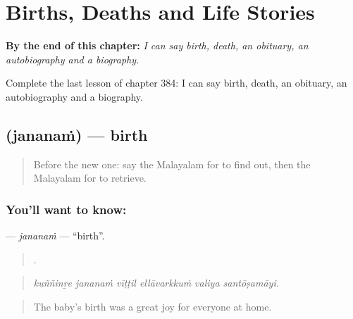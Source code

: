 
\chapter{Births, Deaths and Life Stories}
\label{ch:ml-births-deaths-and-life-stories}

\begin{chapteropening}
\textbf{By the end of this chapter:} \emph{I can say birth, death, an obituary, an autobiography and a biography.}

Complete the last lesson of chapter 384: I can say birth, death, an obituary, an autobiography and a biography.
\end{chapteropening}

\section[\texorpdfstring{\ml{ജനനം} (jananaṁ)}{ജനനം (jananaṁ)}]{ (jananaṁ) — birth}

\label{lesson:ML-C384-jananam}



\begin{quote}
Before the new one: say the Malayalam for to find out, then the Malayalam for to retrieve.
\end{quote}

\subsection*{You'll want to know: }
\textbf{} — \emph{jananaṁ} — \textquotedblleft{}birth\textquotedblright{}.

\begin{quote}
     .
\end{quote}

\begin{quote}
\emph{kuññinṟe jananaṁ vīṭṭil ellāvarkkuṁ valiya santōṣamāyi.}
\end{quote}

\begin{quote}
The baby's birth was a great joy for everyone at home.
\end{quote}

